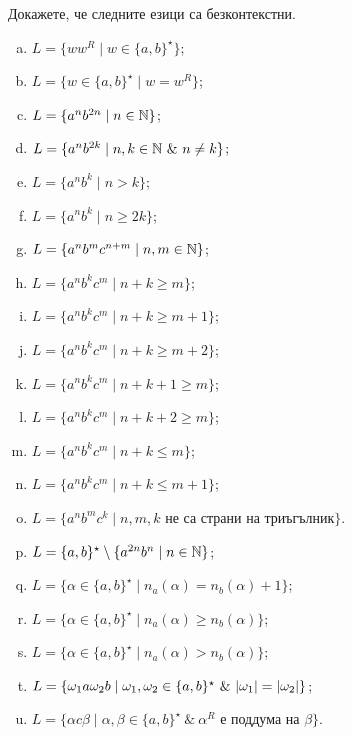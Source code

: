 \begin{problem}
  Докажете, че следните езици са безконтекстни.
  \begin{enumerate}[a)]
  \item
    $L = \{ww^R \mid w \in \{a,b\}^\star\}$;
  \item
    $L = \{w \in \{a,b\}^\star \mid w = w^R\}$;
  \item
    $L = \{a^nb^{2n} \mid n \in \mathbb{N}\}$;
  \item
    $L = \{a^nb^{2k} \mid n,k \in \Nat\ \&\ n \neq k\}$;
  \item
    $L = \{a^nb^k \mid n > k\}$;
  \item
    $L = \{a^nb^k \mid n \geq 2k\}$;
  \item
    $L = \{a^nb^mc^{n+m}\mid n,m \in \mathbb{N}\}$;
  \item
    $L = \{a^nb^kc^m \mid n + k \geq m\}$;
  \item
    $L = \{a^nb^kc^m \mid n + k \geq m+1\}$;
  \item
    $L = \{a^nb^kc^m \mid n + k \geq m+2\}$;
  \item
    $L = \{a^nb^kc^m \mid n + k + 1 \geq m\}$;
  \item
    $L = \{a^nb^kc^m \mid n + k + 2 \geq m\}$;
  \item
    $L = \{a^nb^kc^m \mid n + k \leq m\}$;
  \item
    $L = \{a^nb^kc^m \mid n + k \leq m+1\}$;
  \item
    $L = \{a^nb^mc^k \mid n, m, k \text{ не са страни на триъгълник}\}$.
  \item
    $L = \{a,b\}^\star \setminus \{a^{2n}b^n \mid n\in\mathbb{N}\}$;
  \item
    $L = \{\alpha \in \{a,b\}^\star\mid n_a(\alpha) = n_b(\alpha) + 1\}$;
  \item
    $L = \{\alpha \in \{a,b\}^\star\mid n_a(\alpha) \geq n_b(\alpha)\}$;
  \item
    $L = \{\alpha \in \{a,b\}^\star\mid n_a(\alpha) > n_b(\alpha)\}$;
  \item
    $L = \{\omega_1 a \omega_2 b \mid \omega_1,\omega_2 \in \{a,b\}^\star\ \&\ \lvert{\omega_1}\rvert = \lvert{\omega_2}\rvert\}$;
  \item
    $L = \{\alpha c \beta \mid \alpha,\beta \in \{a,b\}^\star\ \&\ \alpha^R\mbox{ е поддума на }\beta \}$.
  \end{enumerate}
\end{problem}

